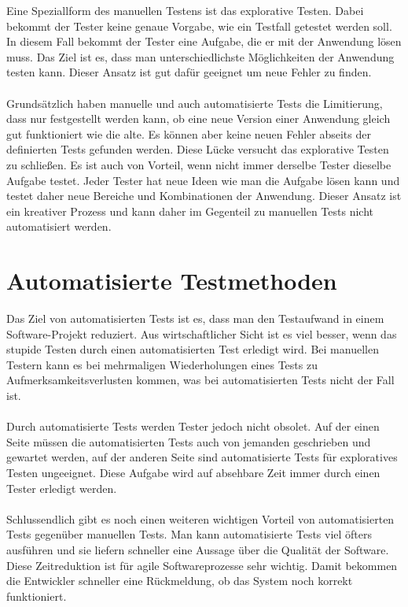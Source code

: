 Eine Speziallform des manuellen Testens ist das explorative Testen. Dabei bekommt der Tester keine genaue Vorgabe, wie ein Testfall getestet werden soll. In diesem Fall bekommt der Tester eine Aufgabe, die er mit der Anwendung lösen muss. Das Ziel ist es, dass man unterschiedlichste Möglichkeiten der Anwendung testen kann. Dieser Ansatz ist gut dafür geeignet um neue Fehler zu finden. \\
\\
Grundsätzlich haben manuelle und auch automatisierte Tests die Limitierung, dass nur festgestellt werden kann, ob eine neue Version einer Anwendung gleich gut funktioniert wie die alte. Es können aber keine neuen Fehler abseits der definierten Tests gefunden werden. Diese Lücke versucht das explorative Testen zu schließen. Es ist auch von Vorteil, wenn nicht immer derselbe Tester dieselbe Aufgabe testet. Jeder Tester hat neue Ideen wie man die Aufgabe lösen kann und testet daher neue Bereiche und Kombinationen der Anwendung. Dieser Ansatz ist ein kreativer Prozess und kann daher im Gegenteil zu manuellen Tests nicht automatisiert werden.

\section{Automatisierte Testmethoden}

Das Ziel von automatisierten Tests ist es, dass man den Testaufwand in einem Software-Projekt reduziert. Aus wirtschaftlicher Sicht ist es viel besser, wenn das stupide Testen durch einen automatisierten Test erledigt wird. Bei manuellen Testern kann es bei mehrmaligen Wiederholungen eines Tests zu Aufmerksamkeitsverlusten kommen, was bei automatisierten Tests nicht der Fall ist.\\
\\
Durch automatisierte Tests werden Tester jedoch nicht obsolet. Auf der einen Seite müssen die automatisierten Tests auch von jemanden geschrieben und gewartet werden, auf der anderen Seite sind automatisierte Tests für exploratives Testen ungeeignet. Diese Aufgabe wird auf absehbare Zeit immer durch einen Tester erledigt werden.\\
\\
Schlussendlich gibt es noch einen weiteren wichtigen Vorteil von automatisierten Tests gegenüber manuellen Tests. Man kann automatisierte Tests viel öfters ausführen und sie liefern schneller eine Aussage über die Qualität der Software. Diese Zeitreduktion ist für agile Softwareprozesse sehr wichtig. Damit bekommen die Entwickler schneller eine Rückmeldung, ob das System noch korrekt funktioniert. 


